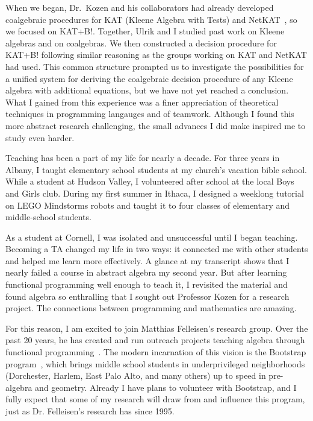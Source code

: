 \documentclass[12pt]{article}
\newcommand{\hdr}[2]{\vspace{-0.4cm}{\flushleft{\hrulefill\\\textbf{#1}\hfill{#2}\\\vspace{-0.2cm}\hrulefill}}\vspace{0.1cm}}
\begin{document}
When we began, Dr.~Kozen and his collaborators had already developed coalgebraic procedures for KAT (Kleene Algebra with Tests) and NetKAT~\cite{foster2014coalgebraic}, so we focused on KAT+B!.
Together, Ulrik and I studied past work on Kleene algebras and on coalgebras.
We then constructed a decision procedure for KAT+B! following similar reasoning as the groups working on KAT and NetKAT had used.
This common structure prompted us to investigate the possibilities for a unified system for deriving the coalgebraic decision procedure of any Kleene algebra with additional equations, but we have not yet reached a conclusion.
What I gained from this experience was a finer appreciation of theoretical techniques in programming langauges and of teamwork.
Although I found this more abstract research challenging, the small advances I did make inspired me to study even harder.

\hdr{Broader Impacts}{}

Teaching has been a part of my life for nearly a decade.
For three years in Albany, I taught elementary school students at my church's vacation bible school.
While a student at Hudson Valley, I volunteered after school at the local Boys and Girls club.
During my first summer in Ithaca, I designed a weeklong tutorial on LEGO Mindstorms robots and taught it to four classes of elementary and middle-school students.

As a student at Cornell, I was isolated and unsuccessful until I began teaching.
Becoming a TA changed my life in two ways: it connected me with other students and helped me learn more effectively.
A glance at my transcript shows that I nearly failed a course in abstract algebra my second year.
But after learning functional programming well enough to teach it, I revisited the material and found algebra so enthralling that I sought out Professor Kozen for a research project.
The connections between programming and mathematics are amazing.

For this reason, I am excited to join Matthias Felleisen's research group.
Over the past 20 years, he has created and run outreach projects teaching algebra through functional programming~\cite{felleisen2010teachscheme}.
The modern incarnation of this vision is the Bootstrap program~\cite{bootstrap}, which brings middle school students in underprivileged neighborhoods (Dorchester, Harlem, East Palo Alto, and many others) up to speed in pre-algebra and geometry.
Already I have plans to volunteer with Bootstrap, and I fully expect that some of my research will draw from and influence this program, just as Dr. Felleisen's research has since 1995.

\vfill
\renewcommand{\section}[2]{}
\footnotesize


\end{document}
